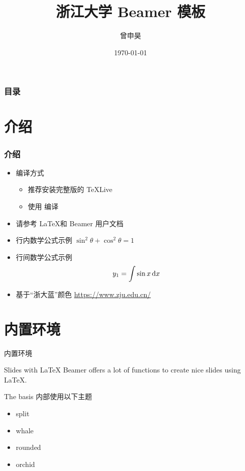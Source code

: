 \documentclass[10pt,aspectratio=169]{beamer}
\title[浙江大学 Beamer 模板]{浙江大学 Beamer 模板}
\author[Shenhao Zeng]{曾申昊}
\date{\today}
\begin{document}
\begin{frame}
	\titlepage
\end{frame}				%

\begin{frame}
	\frametitle{目录}
	\tableofcontents
\end{frame}				%

\section{介绍}
\begin{frame}
	\frametitle{介绍}

	\begin{itemize}
		\item {编译方式}
		      \begin{itemize}
			      \item  推荐安装完整版的 TeXLive
			      \item 使用 \XeLaTeX 编译
		      \end{itemize}
		\item 请参考 \LaTeX 和 Beamer 用户文档

		\item 行内数学公式示例 $\sin^2 \theta + \cos^2 \theta = 1$
		\item {行间数学公式示例 \begin{equation}
			      y_{1}=\int \sin x\, {\rm d}x
		      \end{equation}	 }
		\item 基于“浙大蓝”颜色 \url{https://www.zju.edu.cn/}
	\end{itemize}
\end{frame}

\section{内置环境}
\begin{frame}{内置环境}
	\begin{block}{Slides with \LaTeX}
		Beamer offers a lot of functions to create nice slides using \LaTeX.
	\end{block}

	\begin{block}{The basis}
		内部使用以下主题
		\begin{itemize}
			\item split
			\item whale
			\item rounded
			\item orchid
		\end{itemize}
	\end{block}
\end{frame}
\end{document}
